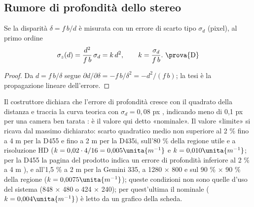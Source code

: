 \subsection{Rumore di profondità dello stereo}\label{sec:geo-rumore}

\begin{proposizione}\label{prop:geo-rumore}
Se la disparità $\delta=f\,b/d$ è misurata con un errore di scarto tipo $\sigma_d$ (pixel), al primo ordine
\begin{equation}\label{eq:geo-sigmaz}
\sigma_z(d)=\frac{d^2}{f\,b}\,\sigma_d=k\,d^2,\qquad k=\frac{\sigma_d}{f\,b}.\ \text{\prova{D}}
\end{equation}
\end{proposizione}
\begin{proof}
Da $d=f\,b/\delta$ segue $\partial d/\partial\delta=-f\,b/\delta^2=-d^2/(f\,b)$; la tesi è la propagazione lineare dell'errore.
\end{proof}

Il costruttore dichiara che l'errore di profondità cresce con il quadrato della distanza e traccia la curva teorica con $\sigma_d=0{,}08$ px \cite{realsense-taratura-profondita}, indicando meno di 0,1 px per una camera ben tarata \cite{realsense-bkm-taratura}: è il valore qui detto «nominale». Il valore «limite» si ricava dal massimo dichiarato: scarto quadratico medio non superiore al 2 \% fino a 4 m per la D455 e fino a 2 m per la D435i, sull'80 \% della regione utile e a risoluzione HD \cite{realsense-d400-accuratezza} ($k=0{,}02\cdot4/16=0{,}005\unita{m^{-1}}$ e $k=0{,}010\unita{m^{-1}}$; per la D455 la pagina del prodotto indica un errore di profondità inferiore al 2 \% a 4 m \cite{realsense-d455}), e all'1,5 \% a 2 m per la Gemini 335, a 1280 × 800 e sul 90 \% × 90 \% della regione \cite{orbbec-gemini-335} ($k=0{,}0075\unita{m^{-1}}$); queste condizioni non sono quelle d'uso del sistema (848 × 480 o 424 × 240); per quest'ultima il nominale ($k=0{,}004\unita{m^{-1}}$) è letto da un grafico della scheda.

